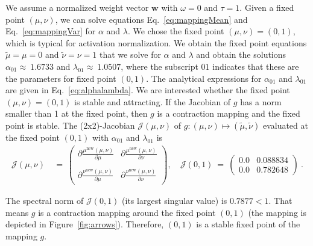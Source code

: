 \documentclass{article}
\newcommand\Bw{\bm{w}}
\newcommand\nn{\mathrm{new}}
\newcommand\munn{{\tilde \mu}}
\newcommand\nunn{{\tilde \nu}}
\begin{document}
We assume a normalized weight
vector $\Bw$ with $\omega=0$ and $\tau=1$. 
Given a fixed point $(\mu,\nu)$,
we can solve equations Eq.~\eqref{eq:mappingMean} and Eq.~\eqref{eq:mappingVar} for  $\alpha$ and
$\lambda$. 
We chose the fixed point $(\mu,\nu)=(0,1)$,
which is typical for activation normalization.
We obtain the fixed point equations $\munn=\mu=0$ and $\nunn=\nu=1$ that we solve  for  $\alpha$ and $\lambda$ and obtain the solutions  $\alpha_{\mathrm{01}}\approx \ 1.6733$ and $\lambda_{\mathrm{01}}\approx \ 1.0507$,
where the subscript ${\mathrm{01}}$ indicates that these are the parameters for fixed point $(0,1)$.
The analytical expressions for $\alpha_{\mathrm{01}}$ and $\lambda_{\mathrm{01}}$ are given in Eq.~\eqref{eq:alphalambda}.  We are interested whether the fixed point $(\mu,\nu)=(0,1)$ is stable
and attracting. If the Jacobian of $g$ has a norm smaller than 1 at the
fixed point, then $g$ is a contraction mapping and the fixed point is stable.
The (2x2)-Jacobian $\mathcal J(\mu,\nu)$ of $g:(\mu,\nu) \mapsto (\munn,\nunn)$ evaluated at the fixed point $(0,1)$ with $\alpha_{\mathrm{01}}$ and 
$\lambda_{\mathrm{01}}$ is 
\begin{align}
\mathcal J(\mu,\nu) \ &= \ 
\begin{pmatrix}
 \partial \frac{\mu^{\nn}(\mu,\nu)}{\partial \mu}  & \partial
 \frac{\mu^{\nn}(\mu,\nu)}{\partial \nu} \\
~ & ~ \\
 \partial \frac{\nu^{\nn}(\mu,\nu)}{\partial \mu} & \partial \frac{\nu^{\nn}(\mu,\nu)}{\partial \nu}
 \end{pmatrix},\
  &\mathcal J(0,1) \ = \
\begin{pmatrix}
 0.0  & 0.088834 \\
 0.0  &  0.782648 
\end{pmatrix} \ .
\end{align}

The spectral norm of $\mathcal J(0,1)$ (its largest
singular value) is $0.7877<1$. That means $g$ is a contraction
mapping around the fixed point $(0,1)$ (the mapping is depicted in Figure~\ref{fig:arrows}).
Therefore, $(0,1)$ is a stable fixed point of
the mapping $g$.
\end{document}
